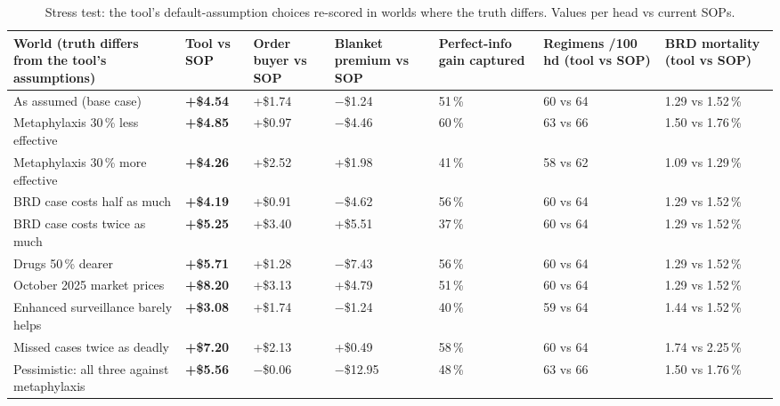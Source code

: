 \documentclass[10pt,letterpaper]{article}
\newcommand{\pct}{\,\%}
\newcommand{\usd}[1]{\$#1}
\begin{document}
\begin{table}[h]
\centering\footnotesize
\caption{Stress test: the tool's default-assumption choices re-scored in worlds where the truth differs. Values per head vs current SOPs.}\label{tab:stress}
\setlength{\tabcolsep}{4pt}
\begin{tabularx}{\linewidth}{@{}>{\raggedright\arraybackslash}X C{1.15cm}C{1.25cm}C{1.35cm}C{1.35cm}C{1.65cm}C{2.0cm}@{}}
\toprule
\textbf{World (truth differs from the tool's assumptions)} & \textbf{Tool vs SOP} & \textbf{Order buyer vs SOP} & \textbf{Blanket premium vs SOP} & \textbf{Perfect-info gain captured} & \textbf{Regimens /100\,hd (tool vs SOP)} & \textbf{BRD mortality (tool vs SOP)} \\
\midrule
As assumed (base case) & \textbf{+\usd{4.54}} & +\usd{1.74} & $-$\usd{1.24} & 51\pct & 60 vs 64 & 1.29 vs 1.52\pct \\
Metaphylaxis 30\pct{} less effective & \textbf{+\usd{4.85}} & +\usd{0.97} & $-$\usd{4.46} & 60\pct & 63 vs 66 & 1.50 vs 1.76\pct \\
Metaphylaxis 30\pct{} more effective & \textbf{+\usd{4.26}} & +\usd{2.52} & +\usd{1.98} & 41\pct & 58 vs 62 & 1.09 vs 1.29\pct \\
BRD case costs half as much & \textbf{+\usd{4.19}} & +\usd{0.91} & $-$\usd{4.62} & 56\pct & 60 vs 64 & 1.29 vs 1.52\pct \\
BRD case costs twice as much & \textbf{+\usd{5.25}} & +\usd{3.40} & +\usd{5.51} & 37\pct & 60 vs 64 & 1.29 vs 1.52\pct \\
Drugs 50\pct{} dearer & \textbf{+\usd{5.71}} & +\usd{1.28} & $-$\usd{7.43} & 56\pct & 60 vs 64 & 1.29 vs 1.52\pct \\
October 2025 market prices & \textbf{+\usd{8.20}} & +\usd{3.13} & +\usd{4.79} & 51\pct & 60 vs 64 & 1.29 vs 1.52\pct \\
Enhanced surveillance barely helps & \textbf{+\usd{3.08}} & +\usd{1.74} & $-$\usd{1.24} & 40\pct & 59 vs 64 & 1.44 vs 1.52\pct \\
Missed cases twice as deadly & \textbf{+\usd{7.20}} & +\usd{2.13} & +\usd{0.49} & 58\pct & 60 vs 64 & 1.74 vs 2.25\pct \\
Pessimistic: all three against metaphylaxis & \textbf{+\usd{5.56}} & $-$\usd{0.06} & $-$\usd{12.95} & 48\pct & 63 vs 66 & 1.50 vs 1.76\pct \\
\bottomrule
\end{tabularx}
\end{table}
\end{document}
